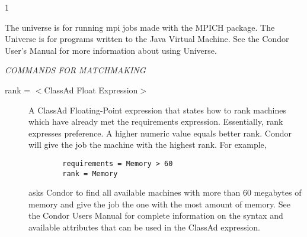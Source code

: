 \begin{ManPage}{\label{man-condor-submit}}{1}
\begin{description}
The  universe is
for running mpi jobs made with the MPICH package.
The  Universe is for programs written to the Java Virtual Machine.
See the Condor User's Manual for more information about using Universe.

\end{description} 


\emph{COMMANDS FOR MATCHMAKING}
\begin{description} 


\item[rank = $<$ClassAd Float Expression$>$]
A ClassAd Floating-Point
expression that states how to rank machines which have already met the requirements
expression. Essentially, rank expresses preference.  A higher numeric value
equals better rank. Condor will give the job the machine with the
highest rank.  For example,
\begin{verbatim}
        requirements = Memory > 60
        rank = Memory
\end{verbatim}
asks Condor to find all available machines with more than 60 megabytes of memory
and give the job the one with the most amount of memory.  See the Condor Users
Manual for complete information on the syntax and available attributes
that can be used in the ClassAd expression.



\end{description}
\end{ManPage}
